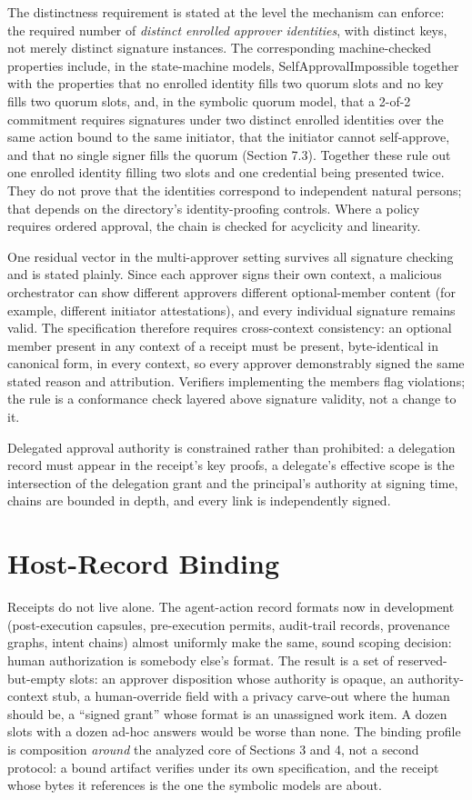 \documentclass[11pt]{article}
\begin{document}
The distinctness requirement is stated at the level the mechanism can enforce:
the required number of \emph{distinct enrolled approver identities}, with distinct
keys, not merely distinct signature instances. The corresponding machine-checked
properties include, in the state-machine models, SelfApprovalImpossible together
with the properties that no enrolled identity fills two quorum slots and no key
fills two quorum slots, and, in the symbolic quorum model, that a 2-of-2 commitment
requires signatures under two distinct enrolled identities over the same action
bound to the same initiator, that the initiator cannot self-approve, and that no
single signer fills the quorum (Section 7.3). Together these rule out one enrolled
identity filling two slots and one credential being presented twice. They do not
prove that the identities correspond to independent natural persons; that depends
on the directory's identity-proofing controls. Where a policy requires ordered
approval, the chain is checked for acyclicity and linearity.

One residual vector in the multi-approver setting survives all signature checking
and is stated plainly. Since each approver signs their own context, a malicious
orchestrator can show different approvers different optional-member content (for
example, different initiator attestations), and every individual signature remains
valid. The specification therefore requires cross-context consistency: an optional
member present in any context of a receipt must be present, byte-identical in
canonical form, in every context, so every approver demonstrably signed the same
stated reason and attribution. Verifiers implementing the members flag violations;
the rule is a conformance check layered above signature validity, not a change to
it.

Delegated approval authority is constrained rather than prohibited: a delegation
record must appear in the receipt's key proofs, a delegate's effective scope is
the intersection of the delegation grant and the principal's authority at signing
time, chains are bounded in depth, and every link is independently signed.

\section{Host-Record Binding}

Receipts do not live alone. The agent-action record formats now in development
(post-execution capsules, pre-execution permits, audit-trail records, provenance
graphs, intent chains) almost uniformly make the same, sound scoping decision:
human authorization is somebody else's format. The result is a set of
reserved-but-empty slots: an approver disposition whose authority is opaque, an
authority-context stub, a human-override field with a privacy carve-out where the
human should be, a ``signed grant'' whose format is an unassigned work item. A
dozen slots with a dozen ad-hoc answers would be worse than none. The binding
profile is composition \emph{around} the analyzed core of Sections 3 and 4, not a
second protocol: a bound artifact verifies under its own specification, and the
receipt whose bytes it references is the one the symbolic models are about.
\end{document}
